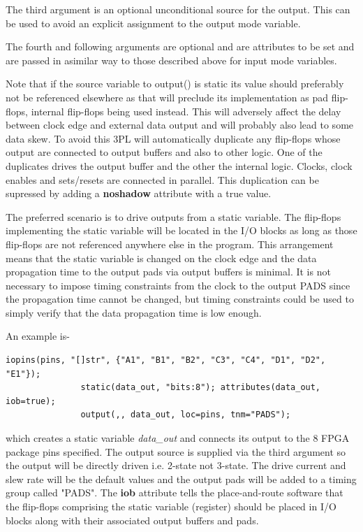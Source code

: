             The third argument is an optional unconditional source for the output.
            This can be used to avoid an explicit assignment to the output mode
            variable.

            The fourth and following arguments are optional and are attributes to be
            set and are passed in asimilar way to those described above for input
            mode variables.

            Note that if the source variable to output() is static its value should
            preferably not be referenced elsewhere as that will preclude its
            implementation as pad flip-flops, internal flip-flops being used
            instead. This will adversely affect the delay between clock edge and
            external data output and will probably also lead to some data skew. To
            avoid this 3PL will automatically duplicate any flip-flops whose output
            are connected to output buffers and also to other logic. One of the
            duplicates drives the output buffer and the other the internal logic.
            Clocks, clock enables and sets/resets are connected in parallel. This
            duplication can be supressed by adding a {\bf noshadow} attribute
            with a true value.

            The preferred scenario is to drive outputs from a static variable.
            The flip-flops implementing the static variable will be located in
            the I/O blocks as long as those flip-flops are not referenced
            anywhere else in the program. This arrangement means that the
            static variable is changed on the clock edge and the data
            propagation time to the output pads via output buffers is minimal.
            It is not necessary to impose timing constraints from the clock to
            the output PADS since the propagation time cannot be changed,
            but timing constraints could be used to simply verify that the
            data propagation time is low enough.
            
            An example is-
            \begin{lstlisting}[gobble=12, language=threepl]
               iopins(pins, "[]str", {"A1", "B1", "B2", "C3", "C4", "D1", "D2", "E1"});
               static(data_out, "bits:8"); attributes(data_out, iob=true);
               output(,, data_out, loc=pins, tnm="PADS");
            \end{lstlisting}
            which creates a static variable {\em data\_out}
            and connects its output to the 8 FPGA package pins specified. The
            output source is supplied via the third argument so the output will be
            directly driven i.e. 2-state not 3-state. The drive current and slew
            rate will be the default values and the output pads will be added to a
            timing group called "PADS". The {\bf iob} attribute tells the
            place-and-route software that the flip-flops comprising the static
            variable (register) should be placed in I/O blocks along with their
            associated output buffers and pads.
            
